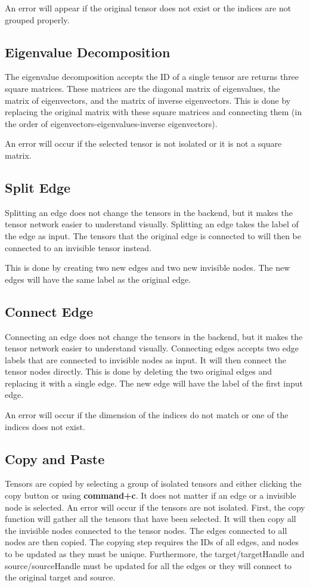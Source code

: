 \documentclass{juliacon}
\begin{document}
\begin{appendix}
An error will appear if the original tensor does not exist or the indices are not grouped properly.


\subsection{Eigenvalue Decomposition}
The eigenvalue decomposition accepts the ID of a single tensor are returns three square matrices. These matrices are the diagonal matrix of eigenvalues, the matrix of eigenvectors, and the matrix of inverse eigenvectors. This is done by replacing the original matrix with these square matrices and connecting them (in the order of eigenvectors-eigenvalues-inverse eigenvectors). 

An error will occur if the selected tensor is not isolated or it is not a square matrix.

\subsection{Split Edge}
Splitting an edge does not change the tensors in the backend, but it makes the tensor network easier to understand visually. Splitting an edge takes the label of the edge as input. The tensors that the original edge is connected to will then be connected to an invisible tensor instead.

This is done by creating two new edges and two new invisible nodes. The new edges will have the same label as the original edge.

\subsection{Connect Edge}
Connecting an edge does not change the tensors in the backend, but it makes the tensor network easier to understand visually. Connecting edges accepts two edge labels that are connected to invisible nodes as input. It will then connect the tensor nodes directly. This is done by deleting the two original edges and replacing it with a single edge. The new edge will have the label of the first input edge. 

An error will occur if the dimension of the indices do not match or one of the indices does not exist.

\subsection{Copy and Paste}
Tensors are copied by selecting a group of isolated tensors and either clicking the copy button or using \textbf{command+c}. It does not matter if an edge or a invisible node is selected. An error will occur if the tensors are not isolated. First, the copy function will gather all the tensors that have been selected. It will then copy all the invisible nodes connected to the tensor nodes. The edges connected to all nodes are then copied. The copying step requires the IDs of all edges, and nodes to be updated as they must be unique. Furthermore, the target/targetHandle and source/sourceHandle must be updated for all the edges or they will connect to the original target and source.


\end{appendix}
\end{document}
